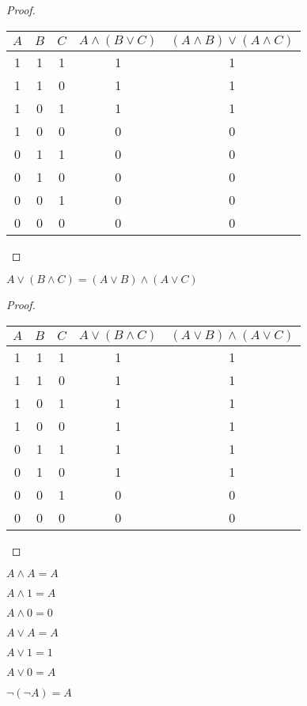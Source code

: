 \begin{proof}
	\hfill \break \break
	\begin{center}
		\begin{tabular}{ |c|c|c|c|c| } 
			\hline
			$A$ & $B$ & $C$ & $A \land (B \lor C)$ & $(A \land B) \lor (A \land C)$ \\
			\hline 
			1 & 1 & 1 & 1 & 1 \\ 
			1 & 1 & 0 & 1 & 1 \\ 
			1 & 0 & 1 & 1 & 1 \\ 
			1 & 0 & 0 & 0 & 0 \\
			0 & 1 & 1 & 0 & 0 \\ 
			0 & 1 & 0 & 0 & 0 \\ 
			0 & 0 & 1 & 0 & 0 \\ 
			0 & 0 & 0 & 0 & 0 \\ 
			\hline
		\end{tabular}
	\end{center}
\end{proof}

\begin{theorem}
	\hfill \break
	$A \lor  (B \land C) = (A \lor B) \land (A \lor C)$
\end{theorem}

\begin{proof}
	\hfill \break \break
	\begin{center}
		\begin{tabular}{ |c|c|c|c|c| } 
			\hline
			$A$ & $B$ & $C$ & $A \lor (B \land C)$ & $(A \lor B) \land (A \lor C)$ \\
			\hline 
			1 & 1 & 1 & 1 & 1 \\ 
			1 & 1 & 0 & 1 & 1 \\ 
			1 & 0 & 1 & 1 & 1 \\ 
			1 & 0 & 0 & 1 & 1 \\
			0 & 1 & 1 & 1 & 1 \\ 
			0 & 1 & 0 & 1 & 1 \\ 
			0 & 0 & 1 & 0 & 0 \\ 
			0 & 0 & 0 & 0 & 0 \\ 
			\hline
		\end{tabular}
	\end{center}
\end{proof}

\begin{theorem}
	$A \land A = A$
\end{theorem}

\begin{theorem}
	$A \land 1 = A$
\end{theorem}

\begin{theorem}
	$A \land 0 = 0$
\end{theorem}

\begin{theorem}
	$A \lor A = A$
\end{theorem}

\begin{theorem}
	$A \lor 1 = 1$
\end{theorem}

\begin{theorem}
	$A \lor 0 = A$
\end{theorem}

\begin{theorem}
	$\neg (\neg A) = A$
\end{theorem}




